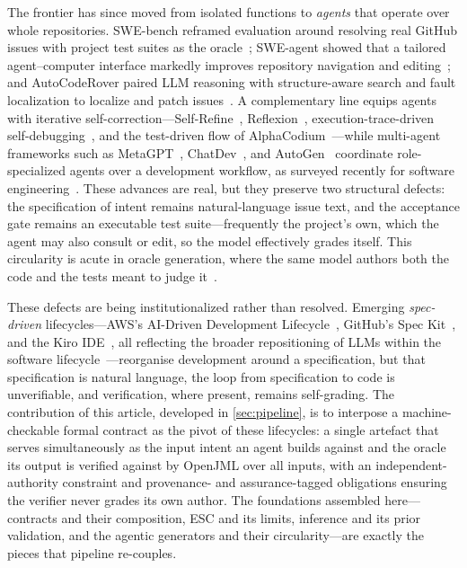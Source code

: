 The frontier has since moved from isolated functions to \emph{agents} that operate over whole repositories. SWE-bench reframed evaluation around resolving real GitHub issues with project test suites as the oracle~\cite{jimenez2024swebench}; SWE-agent showed that a tailored agent--computer interface markedly improves repository navigation and editing~\cite{yang2024sweagent}; and AutoCodeRover paired LLM reasoning with structure-aware search and fault localization to localize and patch issues~\cite{zhang2024autocoderover}. A complementary line equips agents with iterative self-correction---Self-Refine~\cite{madaan2023selfrefine}, Reflexion~\cite{shinn2023reflexion}, execution-trace-driven self-debugging~\cite{chen2024selfdebug}, and the test-driven flow of AlphaCodium~\cite{ridnik2024alphacodium}---while multi-agent frameworks such as MetaGPT~\cite{hong2024metagpt}, ChatDev~\cite{qian2024chatdev}, and AutoGen~\cite{wu2024autogen} coordinate role-specialized agents over a development workflow, as surveyed recently for software engineering~\cite{liu2024llmagentse}. These advances are real, but they preserve two structural defects: the specification of intent remains natural-language issue text, and the acceptance gate remains an executable test suite---frequently the project's own, which the agent may also consult or edit, so the model effectively grades itself. This circularity is acute in oracle generation, where the same model authors both the code and the tests meant to judge it~\cite{liu2026oracle}.

These defects are being institutionalized rather than resolved. Emerging \emph{spec-driven} lifecycles---AWS's AI-Driven Development Lifecycle~\cite{awsaidlc}, GitHub's Spec Kit~\cite{githubspeckit}, and the Kiro IDE~\cite{awskiro}, all reflecting the broader repositioning of LLMs within the software lifecycle~\cite{ozkaya2023llmse}---reorganise development around a specification, but that specification is natural language, the loop from specification to code is unverifiable, and verification, where present, remains self-grading. The contribution of this article, developed in \cref{sec:pipeline}, is to interpose a machine-checkable formal contract as the pivot of these lifecycles: a single artefact that serves simultaneously as the input intent an agent builds against and the oracle its output is verified against by OpenJML over all inputs, with an independent-authority constraint and provenance- and assurance-tagged obligations ensuring the verifier never grades its own author. The foundations assembled here---contracts and their composition, ESC and its limits, inference and its prior validation, and the agentic generators and their circularity---are exactly the pieces that pipeline re-couples.
